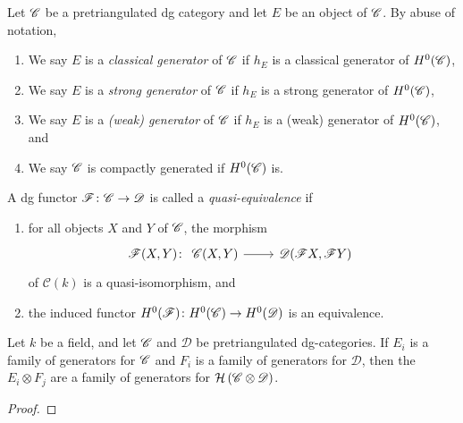 \documentclass[dissertation.tex]{subfiles}
\begin{document}
\begin{defn}
  Let $\mathscr{C}$ be a pretriangulated dg category and let $E$ be an object of $\mathscr{C}$.
  By abuse of notation, 
  \begin{enumerate}
  \item
    We say $E$ is a {\it classical generator} of $\mathscr{C}$ if $h_E$ is a classical generator of $H^0(\mathscr{C})$,
  \item
    We say $E$ is a {\it strong generator} of $\mathscr{C}$ if $h_E$ is a strong generator of $H^0(\mathscr{C})$,
  \item
    We say $E$ is a {\it (weak) generator} of $\mathscr{C}$ if $h_E$ is a (weak) generator of $H^0(\mathscr{C})$, and
  \item
    We say $\mathscr{C}$ is compactly generated if $H^0(\mathscr{C})$ is.
  \end{enumerate}
\end{defn}


\begin{defn}
  A dg functor $\mathscr{F} \colon \mathscr{C} \rightarrow \mathscr{D}$ is called a {\it quasi-equivalence} if 
  \begin{enumerate}
  \item
    for all objects $X$ and $Y$ of $\mathscr{C}$, the morphism
    $$\mathscr{F}(X,Y) \colon
    \begin{tikzcd}
      \CC(X,Y) \arrow{r} & \D(\mathscr{F}X,\mathscr{F}Y)
    \end{tikzcd}$$
    of $\mathcal{C}(k)$ is a quasi-isomorphism, and
  \item
    the induced functor $H^0(\mathscr{F}) \colon H^0(\mathscr{C}) \rightarrow H^0(\mathscr{D})$ is an equivalence.
  \end{enumerate}
\end{defn}

\begin{thm}
  Let $k$ be a field, and let $\mathscr{C}$ and $\mathscr{D}$ be pretriangulated dg-categories.
  If $E_i$ is a family of generators for $\mathscr{C}$ and $F_i$ is a family of generators for $\mathscr{D}$, then the $E_i \otimes F_j$ are a family of generators for $\mathcal{H}\left(\mathscr{C} \otimes \mathscr{D}\right)$.
  
  \begin{proof}
  \end{proof}
\end{thm}
\end{document}

